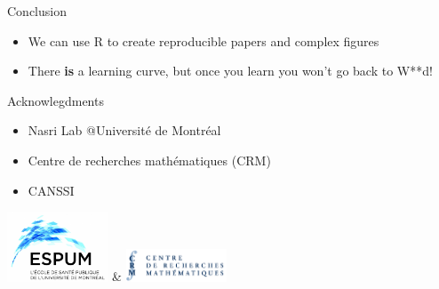 \documentclass[
  ignorenonframetext,
]{beamer}
\providecommand{\tightlist}{%
  \setlength{\itemsep}{0pt}\setlength{\parskip}{0pt}}\usepackage{longtable,booktabs,array}
\begin{document}
\begin{frame}{Conclusion}
\protect\hypertarget{conclusion}{}
\begin{itemize}[<+->]
\tightlist
\item
  We can use R to create reproducible papers and complex figures
\item
  There \textbf{is} a learning curve, but once you learn you won't go
  back to W**d!
\end{itemize}
\end{frame}

\begin{frame}{Acknowlegdments}
\protect\hypertarget{acknowlegdments}{}
\begin{itemize}[<+->]
\tightlist
\item
  Nasri Lab @Université de Montréal
\item
  Centre de recherches mathématiques (CRM)
\item
  CANSSI
\end{itemize}

\vspace{0.01em}
\centering

\includegraphics[width=3cm]{figures/espum.jpg} \&
\includegraphics[width=3cm]{figures/crm.png}
\end{frame}
\end{document}
